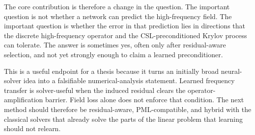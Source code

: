 The core contribution is therefore a change in the question. The important
question is not whether a network can predict the high-frequency field. The
important question is whether the error in that prediction lies in directions
that the discrete high-frequency operator and the CSL-preconditioned Krylov
process can tolerate. The answer is sometimes yes, often only after
residual-aware selection, and not yet strongly enough to claim a learned
preconditioner.

This is a useful endpoint for a thesis because it turns an initially broad
neural-solver idea into a falsifiable numerical-analysis statement. Learned
frequency transfer is solver-useful when the induced residual clears the
operator-amplification barrier. Field loss alone does not enforce that
condition. The next method should therefore be residual-aware, PML-compatible,
and hybrid with the classical solvers that already solve the parts of the
linear problem that learning should not relearn.



